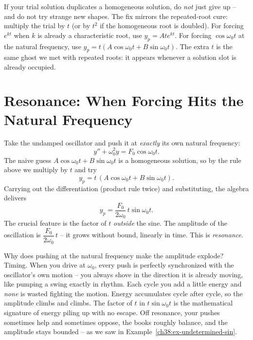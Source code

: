 \begin{trapbox}
If your trial solution duplicates a homogeneous solution, do \emph{not} just give
up -- and do not try strange new shapes. The fix mirrors the repeated-root cure:
multiply the trial by $t$ (or by $t^2$ if the homogeneous root is doubled). For
forcing $e^{kt}$ when $k$ is already a characteristic root, use $y_p = A t e^{kt}$.
For forcing $\cos\omega_0 t$ at the natural frequency, use $y_p = t(A\cos\omega_0 t
+ B\sin\omega_0 t)$. The extra $t$ is the same ghost we met with repeated roots:
it appears whenever a solution slot is already occupied.
\end{trapbox}

\section{Resonance: When Forcing Hits the Natural Frequency}
\label{ch38:resonance}

Take the undamped oscillator and push it at \emph{exactly} its own natural
frequency:
\begin{equation}
  y'' + \omega_0^2 y = F_0 \cos\omega_0 t.
  \label{ch38:resonance-eq}
\end{equation}
The naive guess $A\cos\omega_0 t + B\sin\omega_0 t$ is a homogeneous solution, so
by the rule above we multiply by $t$ and try
\[
  y_p = t\,(A\cos\omega_0 t + B\sin\omega_0 t).
\]
Carrying out the differentiation (product rule twice) and substituting, the
algebra delivers
\[
  y_p = \frac{F_0}{2\omega_0}\, t \sin\omega_0 t.
\]
The crucial feature is the factor of $t$ \emph{outside} the sine. The amplitude
of the oscillation is $\dfrac{F_0}{2\omega_0}\,t$ -- it grows without bound,
linearly in time. This is \emph{resonance}.

\begin{happeningbox}
Why does pushing at the natural frequency make the amplitude explode? Timing.
When you drive at $\omega_0$, every push is perfectly synchronized with the
oscillator's own motion -- you always shove in the direction it is already
moving, like pumping a swing exactly in rhythm. Each cycle you add a little
energy and \emph{none} is wasted fighting the motion. Energy accumulates cycle
after cycle, so the amplitude climbs and climbs. The factor of $t$ in $t\sin
\omega_0 t$ is the mathematical signature of energy piling up with no escape. Off
resonance, your pushes sometimes help and sometimes oppose, the books roughly
balance, and the amplitude stays bounded -- as we saw in
Example~\ref{ch38:ex-undetermined-sin}.
\end{happeningbox}

